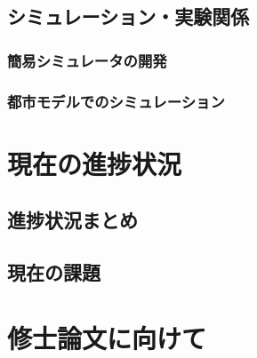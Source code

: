 \documentclass{article}[jsarticle]
\begin{document}
\subsection{シミュレーション・実験関係}
\subsubsection{簡易シミュレータの開発}
\subsubsection{都市モデルでのシミュレーション}
\section{現在の進捗状況}
\subsection{進捗状況まとめ}
\subsection{現在の課題}
\section{修士論文に向けて}
\appendix
\end{document}
